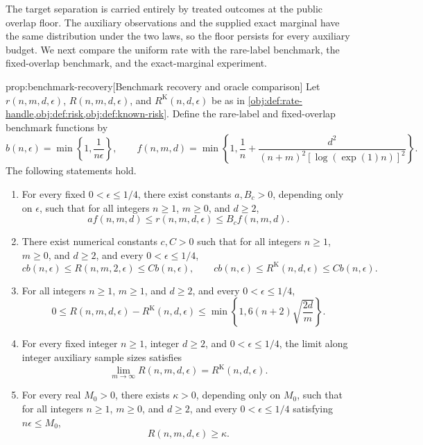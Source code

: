 The target separation is carried entirely by treated outcomes at the public overlap floor. The auxiliary observations and the supplied exact marginal have the same distribution under the two laws, so the floor persists for every auxiliary budget. We next compare the uniform rate with the rare-label benchmark, the fixed-overlap benchmark, and the exact-marginal experiment.

\begin{propositionv}{prop:benchmark-recovery}[Benchmark recovery and oracle comparison]
Let \(r(n,m,d,\epsilon)\), \(R(n,m,d,\epsilon)\), and \(R^{\mathrm K}(n,d,\epsilon)\) be as in \cref{obj:def:rate-handle,obj:def:risk,obj:def:known-risk}. Define the rare-label and fixed-overlap benchmark functions by
\[
b(n,\epsilon)=\min\left\{1,\frac{1}{n\epsilon}\right\},
\qquad
f(n,m,d)=\min\left\{1,\frac{1}{n}
+\frac{d^2}{(n+m)^2[\log(\exp(1)n)]^2}\right\}.
\]
The following statements hold.
\begin{enumerate}
\item For every fixed \(0<\epsilon\le 1/4\), there exist constants \(a,B_c>0\), depending only on \(\epsilon\), such that for all integers \(n\ge1\), \(m\ge0\), and \(d\ge2\),
\[
a f(n,m,d)\le r(n,m,d,\epsilon)\le B_c f(n,m,d).
\]

\item There exist numerical constants \(c,C>0\) such that for all integers \(n\ge1\), \(m\ge0\), and \(d\ge2\), and every \(0<\epsilon\le1/4\),
\[
c b(n,\epsilon)\le R(n,m,2,\epsilon)\le C b(n,\epsilon),
\qquad
c b(n,\epsilon)\le R^{\mathrm K}(n,d,\epsilon)\le C b(n,\epsilon).
\]

\item For all integers \(n\ge1\), \(m\ge1\), and \(d\ge2\), and every \(0<\epsilon\le1/4\),
\[
0\le R(n,m,d,\epsilon)-R^{\mathrm K}(n,d,\epsilon)
\le \min\left\{1,6(n+2)\sqrt{\frac{2d}{m}}\right\}.
\]

\item For every fixed integer \(n\ge1\), integer \(d\ge2\), and \(0<\epsilon\le1/4\), the limit along integer auxiliary sample sizes satisfies
\[
\lim_{m\to\infty}R(n,m,d,\epsilon)=R^{\mathrm K}(n,d,\epsilon).
\]

\item For every real \(M_0>0\), there exists \(\kappa>0\), depending only on \(M_0\), such that for all integers \(n\ge1\), \(m\ge0\), and \(d\ge2\), and every \(0<\epsilon\le1/4\) satisfying \(n\epsilon\le M_0\),
\[
R(n,m,d,\epsilon)\ge\kappa.
\]
\end{enumerate}
\end{propositionv}

